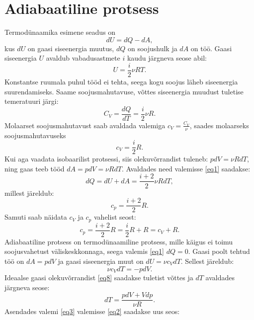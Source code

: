 \documentclass{trkut}%
\begin{document}
\section{Adiabaatiline protsess}
Termodünaamika esimene seadus on
\begin{equation}\label{eq1}
dU = dQ - dA ,
\end{equation}
kus $dU$ on gaasi siseenergia muutus, $dQ$ on soojushulk ja $dA$ on töö. Gaasi siseenergia $U$ avaldub vabadusastmete $i$ kaudu järgneva seose abil:
\begin{equation}\label{eq5}
U = \frac{i}{2} \nu R T.
\end{equation}
Konstantse ruumala puhul tööd ei tehta, seega kogu soojus läheb siseenergia suurendamiseks. Saame soojusmahutavuse, võttes siseenergia muudust tuletise temeratuuri järgi:
\begin{equation}\label{eq6}
C_V = \frac{dQ}{dT}=\frac{i}{2}\nu R .
\end{equation}
Molaarset soojusmahutavust saab avaldada valemiga $c_V = \frac{C_V}{\nu}$, saades molaarseks soojusmahutavuseks
\begin{equation}\label{eq7}
c_V = \frac{i}{2}R .
\end{equation}
Kui aga vaadata isobaarilist protsessi, siis olekuvõrrandist tuleneb: $pdV=\nu RdT$, ning gaas teeb tööd $dA = pdV = \nu RdT$. Avaldades need valemisse \ref{eq1} saadakse:
\begin{equation*}
dQ = dU + dA = \frac{i+2}{2} \nu R dT ,
\end{equation*}
millest järeldub:
\begin{equation*}
c_p=\frac{i+2}{2}R.
\end{equation*}
Samuti saab näidata $c_V$ ja $c_p$ vahelist seost:
\begin{equation}\label{eq9}
c_p =\frac{i+2}{2}R = \frac{i}{2}R + R = c_V + R.
\end{equation}
Adiabaatiline protsess on termodünaamiline protsess, mille käigus ei toimu soojusvahetust väliskeskkonnaga, seega valemis \ref{eq1} $dQ=0$. Gaasi poolt tehtud töö on $d A=pdV$ ja gaasi siseenergia muut on $dU=\nu c_VdT$. Sellest järeldub:
\begin{equation}\label{eq2}
\nu c_VdT = -pdV.
\end{equation}
Ideaalse gaasi olekuvõrrandist \ref{eq8} saadakse tuletist võttes ja $dT$ avaldades järgneva seose:
\begin{equation}\label{eq3}
dT = \frac{pdV+Vdp}{\nu R}.
\end{equation}
Asendades valemi \ref{eq3} valemisse \ref{eq2} saadakse uus seos:
\end{document}

